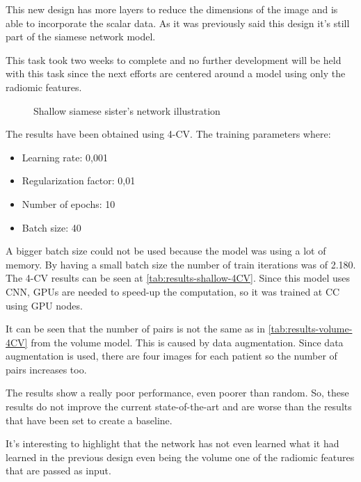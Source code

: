 This new design has more layers to reduce the dimensions of the image and is able to 
incorporate the scalar data. As it was previously said this design it's still part of the
siamese network model.

This task took two weeks to complete and no further development will be held with this task
since the next efforts are centered around a model using only the radiomic features.

\begin{figure}
  \centering
  
  \caption{Shallow siamese sister's network illustration \label{fig:shallow-implement}}
\end{figure}


The results have been obtained using 4-\gls{CV}. The training parameters where:
\begin{itemize}
  \item Learning rate: 0,001
  \item Regularization factor: 0,01
  \item Number of epochs: 10
  \item Batch size: 40
\end{itemize}
A bigger batch size could not be used because
the model was using a lot of memory. By having a small batch size the number of train 
iterations was of 2.180. The 4-\gls{CV} results can be seen at \autoref{tab:results-shallow-4CV}.
Since this model uses \gls{CNN}, \glspl{GPU} are needed to speed-up the computation, so 
it was trained at \gls{CC} using \gls{GPU} nodes.

It can be seen that the number of pairs is not the same as in \autoref{tab:results-volume-4CV} 
from the volume model. This is caused by data augmentation. Since
data augmentation is used, there are four images for each patient so the number of pairs
increases too.

The results show a really poor performance, even poorer than random. So, these results
do not improve the current state-of-the-art and are worse than the results that have 
been set to create a baseline. 

It's interesting to highlight that the network has not even learned what it had learned in the 
previous design even being the volume one of the radiomic features
that are passed as input.

